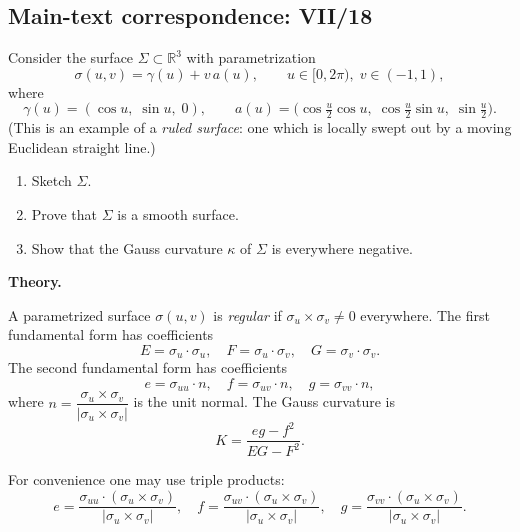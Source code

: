 \subsection*{Main-text correspondence: VII/18}

\begin{problem}
\label{prob:cp-vii-0054}
Consider the surface $\Sigma \subset \mathbb{R}^3$ with parametrization
\[
\sigma(u,v)=\gamma(u)+v\,a(u),\qquad
u\in[0,2\pi),\; v\in(-1,1),
\]
where
\[
\gamma(u)=(\cos u,\;\sin u,\;0),\qquad
a(u)=\bigl(\cos\tfrac u2\cos u,\;\cos\tfrac u2\sin u,\;\sin\tfrac u2\bigr).
\]
(This is an example of a \emph{ruled surface}: one which is locally swept out
by a moving Euclidean straight line.)

\begin{enumerate}
	\item Sketch $\Sigma$.
	\item Prove that $\Sigma$ is a smooth surface.
	\item Show that the Gauss curvature $\kappa$ of $\Sigma$ is everywhere negative.
\end{enumerate}

\par\medskip\noindent\textbf{Theory.}\par\smallskip

A parametrized surface $\sigma(u,v)$ is \emph{regular} if
$\sigma_u\times\sigma_v\neq 0$ everywhere.
The first fundamental form has coefficients
\[
E=\sigma_u\cdot\sigma_u,\quad
F=\sigma_u\cdot\sigma_v,\quad
G=\sigma_v\cdot\sigma_v.
\]
The second fundamental form has coefficients
\[
e=\sigma_{uu}\cdot n,\quad
f=\sigma_{uv}\cdot n,\quad
g=\sigma_{vv}\cdot n,
\]
where $n=\dfrac{\sigma_u\times\sigma_v}{|\sigma_u\times\sigma_v|}$ is the unit normal.
The Gauss curvature is
\[
K=\frac{eg-f^2}{EG-F^2}.
\]

For convenience one may use triple products:
\[
e = \frac{\sigma_{uu}\cdot(\sigma_u\times\sigma_v)}{|\sigma_u\times\sigma_v|},\quad
f = \frac{\sigma_{uv}\cdot(\sigma_u\times\sigma_v)}{|\sigma_u\times\sigma_v|},\quad
g = \frac{\sigma_{vv}\cdot(\sigma_u\times\sigma_v)}{|\sigma_u\times\sigma_v|}.
\]
\end{problem}

